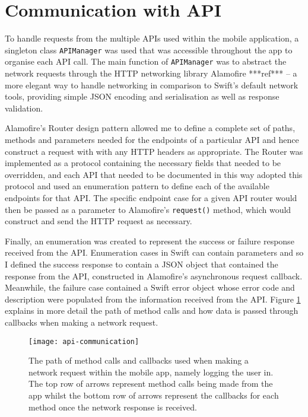 \section{Communication with API}

To handle requests from the multiple APIs used within the mobile application, a singleton class \texttt{APIManager} was used that was accessible throughout the app to organise each API call. The main function of \texttt{APIManager} was to abstract the network requests through the HTTP networking library Alamofire ***ref*** -- a more elegant way to handle networking in comparison to Swift's default network tools, providing simple JSON encoding and serialisation as well as response validation.

Alamofire's Router design pattern allowed me to define a complete set of paths, methods and parameters needed for the endpoints of a particular API and hence construct a request with with any HTTP headers as appropriate. The Router was implemented as a protocol containing the necessary fields that needed to be overridden, and each API that needed to be documented in this way adopted this protocol and used an enumeration pattern to define each of the available endpoints for that API. The specific endpoint case for a given API router would then be passed as a parameter to Alamofire's \texttt{request()} method, which would construct and send the HTTP request as necessary.

Finally, an enumeration was created to represent the success or failure response received from the API. Enumeration cases in Swift can contain parameters and so I defined the success response to contain a JSON object that contained the response from the API, constructed in Alamofire's asynchronous request callback. Meanwhile, the failure case contained a Swift error object whose error code and description were populated from the information received from the API. Figure \ref{fig:api-communication} explains in more detail the path of method calls and how data is passed through callbacks when making a network request.

\begin{figure}[hbt]
  \centering
  \texttt{[image: api-communication]}
  \caption{The path of method calls and callbacks used when making a network request within the mobile app, namely logging the user in. The top row of arrows represent method calls being made from the app whilst the bottom row of arrows represent the callbacks for each method once the network response is received.}
  \label{fig:api-communication}
\end{figure}


